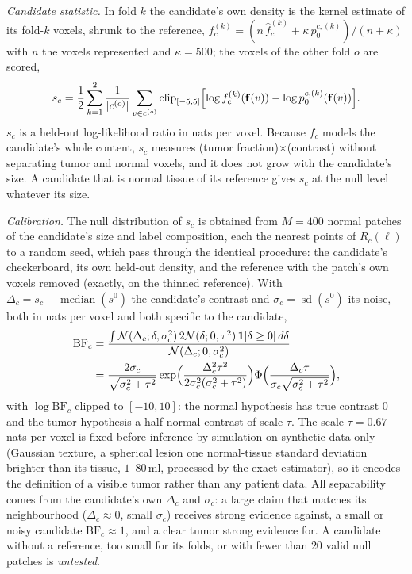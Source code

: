 \documentclass[fleqn,10pt]{olplainarticle}
\begin{document}
\textit{Candidate statistic.} In fold $k$ the candidate's own density is the kernel estimate of its fold-$k$ voxels, shrunk
to the reference, $f_c^{(k)}=(n\,\hat f_c^{(k)}+\kappa\,p_0^{c,(k)})/(n+\kappa)$ with $n$ the voxels represented and
$\kappa=500$; the voxels of the other fold $o$ are scored,
\begin{equation}
\label{eq:heldout}
s_c=\frac12\sum_{k=1}^{2}\frac{1}{|c^{(o)}|}\sum_{v\in c^{(o)}}
\operatorname{clip}_{[-5,5]}\Bigl[\log f_c^{(k)}(\mathbf{f}(v))-\log p_0^{c,(k)}(\mathbf{f}(v))\Bigr].
\end{equation}
$s_c$ is a held-out log-likelihood ratio in nats per voxel. Because $f_c$ models the candidate's whole content, $s_c$
measures (tumor fraction)$\times$(contrast) without separating tumor and normal voxels, and it does not grow with the
candidate's size. A candidate that is normal tissue of its reference gives $s_c$ at the null level whatever its size.

\textit{Calibration.} The null distribution of $s_c$ is obtained from $M=400$ normal patches of the candidate's size and
label composition, each the nearest points of $R_c(\ell)$ to a random seed, which pass through the identical procedure:
the candidate's checkerboard, its own held-out density, and the reference with the patch's own voxels removed (exactly, on
the thinned reference). With $\Delta_c=s_c-\operatorname{median}(s^{0})$ the candidate's contrast and
$\sigma_c=\operatorname{sd}(s^{0})$ its noise, both in nats per voxel and both specific to the candidate,
\begin{equation}
\label{eq:bf}
\begin{split}
\mathrm{BF}_c&=\frac{\int\mathcal{N}(\Delta_c;\delta,\sigma_c^2)\,2\mathcal{N}(\delta;0,\tau^2)\,\mathbf{1}[\delta\ge0]\,d\delta}
{\mathcal{N}(\Delta_c;0,\sigma_c^2)}\\
&=\frac{2\sigma_c}{\sqrt{\sigma_c^2+\tau^2}}\exp\Bigl(\frac{\Delta_c^2\tau^2}{2\sigma_c^2(\sigma_c^2+\tau^2)}\Bigr)
\Phi\Bigl(\frac{\Delta_c\tau}{\sigma_c\sqrt{\sigma_c^2+\tau^2}}\Bigr),
\end{split}
\end{equation}
with $\log\mathrm{BF}_c$ clipped to $[-10,10]$: the normal hypothesis has true contrast $0$ and the tumor hypothesis a
half-normal contrast of scale $\tau$. The scale $\tau=0.67$ nats per voxel is fixed before inference by simulation on
synthetic data only (Gaussian texture, a spherical lesion one normal-tissue standard deviation brighter than its tissue,
$1$--$80$\,ml, processed by the exact estimator), so it encodes the definition of a visible tumor rather than any patient
data. All separability comes from the candidate's own $\Delta_c$ and $\sigma_c$: a large claim that matches its
neighbourhood ($\Delta_c\approx0$, small $\sigma_c$) receives strong evidence against, a small or noisy candidate
$\mathrm{BF}_c\approx1$, and a clear tumor strong evidence for. A candidate without a reference, too small for its
folds, or with fewer than $20$ valid null patches is \emph{untested}.
\end{document}

